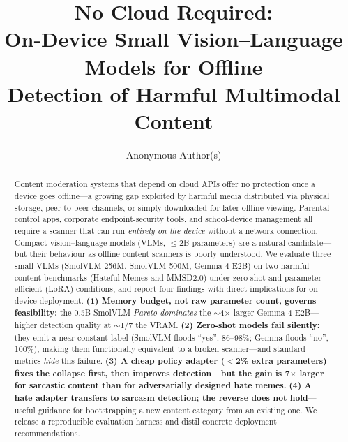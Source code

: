 \documentclass[sigconf,nonacm]{acmart}
\begin{document}
\title{No Cloud Required:\\
On-Device Small Vision--Language Models for Offline\\
Detection of Harmful Multimodal Content}

\author{Anonymous Author(s)}

\begin{abstract}
Content moderation systems that depend on cloud APIs offer no protection once a device
goes offline---a growing gap exploited by harmful media distributed via physical storage,
peer-to-peer channels, or simply downloaded for later offline viewing. Parental-control
apps, corporate endpoint-security tools, and school-device management all require a scanner
that can run \emph{entirely on the device} without a network connection. Compact
vision--language models (VLMs, $\leq$2B parameters) are a natural candidate---but their
behaviour as offline content scanners is poorly understood. We evaluate three small VLMs
(SmolVLM-256M, SmolVLM-500M, Gemma-4-E2B) on two harmful-content benchmarks (Hateful Memes
and MMSD2.0) under zero-shot and parameter-efficient (LoRA) conditions, and report four
findings with direct implications for on-device deployment. \textbf{(1) Memory budget, not
raw parameter count, governs feasibility:} the 0.5B SmolVLM \emph{Pareto-dominates} the
$\sim$4$\times$-larger Gemma-4-E2B---higher detection quality at $\sim$1/7 the VRAM.
\textbf{(2) Zero-shot models fail silently:} they emit a near-constant label (SmolVLM
floods ``yes'', 86--98\%; Gemma floods ``no'', 100\%), making them functionally equivalent
to a broken scanner---and standard metrics \emph{hide} this failure.
\textbf{(3) A cheap policy adapter ($<$2\% extra parameters) fixes the collapse first, then
improves detection---but the gain is 7$\times$ larger for sarcastic content than for
adversarially designed hate memes.} \textbf{(4) A hate adapter transfers to sarcasm
detection; the reverse does not hold}---useful guidance for bootstrapping a new content
category from an existing one. We release a reproducible evaluation harness and distil
concrete deployment recommendations.
\end{abstract}


\maketitle
\end{document}
